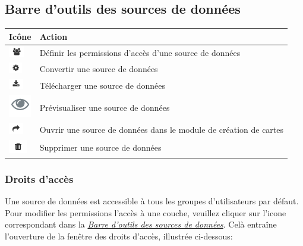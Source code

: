 \documentclass[letterpaper,10pt,french]{sphinxmanual}
\begin{document}
\subsection{Barre d'outils des sources de données}
\label{data/datasources:barre-d-outils-des-sources-de-donnees}\label{data/datasources:datasource-table-label}
\begin{tabulary}{\linewidth}{|L|L|}
\hline

\textbf{Icône}
 & 
\textbf{Action}
\\
\hline
\includegraphics{privileges.png}
 & 
Définir les permissions d'accès d'une source de données
\\
\hline
\includegraphics{process1.png}
 & 
Convertir une source de données
\\
\hline
\includegraphics{download.png}
 & 
Télécharger une source de données
\\
\hline
\includegraphics{preview.png}
 & 
Prévisualiser une source de données
\\
\hline
\includegraphics{share.png}
 & 
Ouvrir une source de données dans le module de création de cartes
\\
\hline
\includegraphics{delete.png}
 & 
Supprimer une source de données
\\
\hline\end{tabulary}



\subsubsection{Droits d'accès}
\label{data/datasources:droits-d-acces}
Une source de données est accessible à tous les groupes d'utilisateurs par défaut. Pour modifier les permissions l'accès à une couche, veuillez cliquer sur l'icone correspondant dans la {\hyperref[data/datasources:datasource-table-label]{\emph{Barre d'outils des sources de données}}}. Celà entraîne l'ouverture de la fenêtre des droits d'accès, illustrée ci-dessous:
\end{document}
